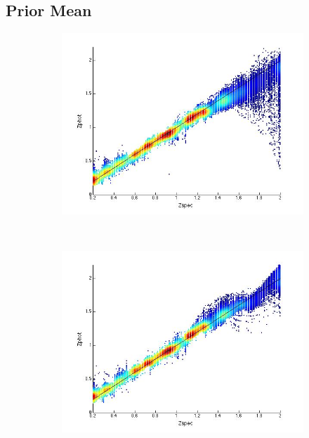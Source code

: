 \documentclass[useAMS,usenatbib,fleqn]{mn2e}
\begin{document}
\subsection{Prior Mean}
\label{subsec-prior-mean}

\begin{figure}
        \centering
        \begin{subfigure}[b]{0.24\textwidth}
                \includegraphics[width=\textwidth]{figures/23_0}
        \end{subfigure}
        ~
        \begin{subfigure}[b]{0.24\textwidth}
                \includegraphics[width=\textwidth]{figures/23_L}
        \end{subfigure}

\end{figure}
\end{document}
